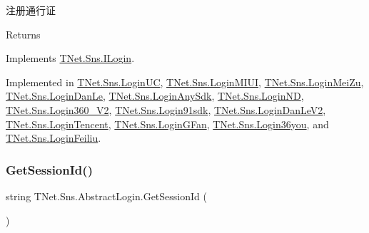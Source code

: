注册通行证 

\begin{DoxyReturn}{Returns}

\end{DoxyReturn}


Implements \mbox{\hyperlink{interface_t_net_1_1_sns_1_1_i_login_a74bd2db9f18c212d23fa01462bb0a845}{T\+Net.\+Sns.\+I\+Login}}.



Implemented in \mbox{\hyperlink{class_t_net_1_1_sns_1_1_login_u_c_a6ba22f5ef4dbee94a5f59020d79f4b58}{T\+Net.\+Sns.\+Login\+UC}}, \mbox{\hyperlink{class_t_net_1_1_sns_1_1_login_m_i_u_i_a600a638293acdeb2e299f047b7f339f5}{T\+Net.\+Sns.\+Login\+M\+I\+UI}}, \mbox{\hyperlink{class_t_net_1_1_sns_1_1_login_mei_zu_a1a3c3c30ba18024e819f0aa8518eedb8}{T\+Net.\+Sns.\+Login\+Mei\+Zu}}, \mbox{\hyperlink{class_t_net_1_1_sns_1_1_login_dan_le_a8f4d8299a72d87be61454902c240f2a2}{T\+Net.\+Sns.\+Login\+Dan\+Le}}, \mbox{\hyperlink{class_t_net_1_1_sns_1_1_login_any_sdk_a70ac7a7b2956ddc6c3d9c7bbba4d99c5}{T\+Net.\+Sns.\+Login\+Any\+Sdk}}, \mbox{\hyperlink{class_t_net_1_1_sns_1_1_login_n_d_a3f84b2292edbc7310abbe64f757f37db}{T\+Net.\+Sns.\+Login\+ND}}, \mbox{\hyperlink{class_t_net_1_1_sns_1_1_login360___v2_a81e62cff8c92b5b35e922e2948202d8a}{T\+Net.\+Sns.\+Login360\+\_\+\+V2}}, \mbox{\hyperlink{class_t_net_1_1_sns_1_1_login91sdk_a036829f25d9543f335e23a33bcf229b6}{T\+Net.\+Sns.\+Login91sdk}}, \mbox{\hyperlink{class_t_net_1_1_sns_1_1_login_dan_le_v2_a10382c3e563022d2f0c4f37769f35107}{T\+Net.\+Sns.\+Login\+Dan\+Le\+V2}}, \mbox{\hyperlink{class_t_net_1_1_sns_1_1_login_tencent_abc09c476353f85c5e8a135d235bcb5c6}{T\+Net.\+Sns.\+Login\+Tencent}}, \mbox{\hyperlink{class_t_net_1_1_sns_1_1_login_g_fan_aaa467dca1a6f8fc8eb55139f9bfad0ca}{T\+Net.\+Sns.\+Login\+G\+Fan}}, \mbox{\hyperlink{class_t_net_1_1_sns_1_1_login36you_a01060a26e8212aaac7e29b634263001a}{T\+Net.\+Sns.\+Login36you}}, and \mbox{\hyperlink{class_t_net_1_1_sns_1_1_login_feiliu_a9a146d3872f6c613a650ad832fd2d68b}{T\+Net.\+Sns.\+Login\+Feiliu}}.

\mbox{\label{class_t_net_1_1_sns_1_1_abstract_login_ad89dd0e8baeffa08b2d5d28e6a2d68cd}} 
\subsubsection{\texorpdfstring{Get\+Session\+Id()}{GetSessionId()}}
{\footnotesize\ttfamily string T\+Net.\+Sns.\+Abstract\+Login.\+Get\+Session\+Id (\begin{DoxyParamCaption}{ }\end{DoxyParamCaption})\hspace{0.3cm}{\ttfamily [protected]}}



